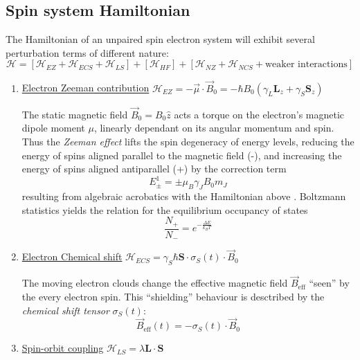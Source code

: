 \documentclass[11.5pt,a4paper]{article}
\begin{document}
\subsection{Spin system Hamiltonian}
The Hamiltonian of an unpaired spin electron system will exhibit several perturbation terms of different nature:
\begin{equation}
 \mathcal{H} = \left[\mathcal{H}_{EZ} + \mathcal{H}_{ECS} + \mathcal{H}_{LS}\right] + \left[\mathcal{H}_{HF}\right] + \left[\mathcal{H}_{NZ} + \mathcal{H}_{NCS} + \text{weaker interactions}\right]
\end{equation}
\begin{enumerate}
  \item \uline{Electron Zeeman contribution} $\mathcal{H}_{EZ} = - \vec{\mu} \cdot \vec{B}_0 = -\hbar B_0 (\gamma_L \mathbf{L}_z + \gamma_S \mathbf{S}_z)$

  The static magnetic field $\vec{B}_0 = B_0 \hat{z}$ acts a torque on the electron's magnetic dipole moment $\mu$, linearly dependant on its angular momentum and spin. Thus the \emph{Zeeman effect} lifts the spin degeneracy of energy levels, reducing the energy of spins aligned parallel to the magnetic field (-), and increasing the energy of spins aligned antiparallel (+) by the correction term
  \begin{equation}
   E^1_\pm = \pm \mu_B \gamma_J B_0 m_J 
  \end{equation}
  resulting from algebraic acrobatics with the Hamiltonian above \cite[insert]{griffiths}.
  Boltzmann statistics yields the relation for the equilibrium occupancy of states
  \begin{equation}
    \frac{N_+}{N_-} = e^{- \frac{\Delta E}{k_B T}}
  \end{equation}

  \item \uline{Electron Chemical shift} $\mathcal{H}_{ECS} = \gamma_S \hbar \mathbf{S} \cdot \sigma_S(t) \cdot \vec{B}_0$
  
  The moving electron clouds change the effective magnetic field $\vec{B}_\text{eff}$ ``seen'' by the every electron spin. This ``shielding'' behaviour is desctribed by the \emph{chemical shift tensor} $\sigma_S(t)$:
  \begin{equation}
    \vec{B}_\text{eff}(t) = - \sigma_S(t) \cdot \vec{B}_0
  \end{equation}

  \item \uline{Spin-orbit coupling} $\mathcal{H}_{LS} = \lambda \mathbf{L}\cdot \mathbf{S}$


\end{enumerate}
\end{document}

